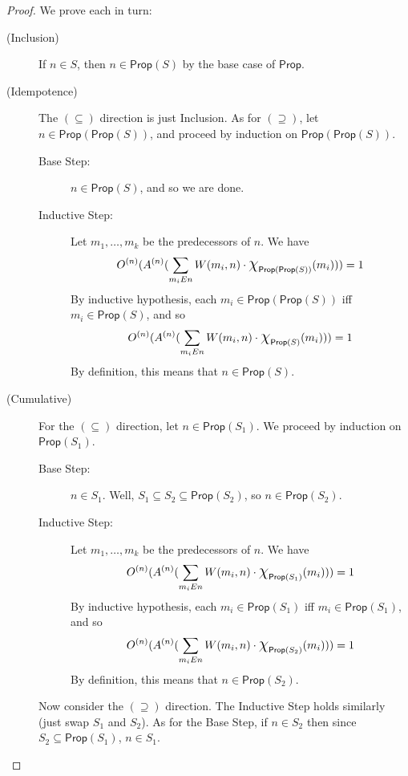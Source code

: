\documentclass[letterpaper]{article}
\theoremstyle{definition}
\newcommand*{\bigchi}{\mbox{\Large$\chi$}}%
\newcommand{\Prop}{\textsf{Prop}}
\begin{document}
\begin{proof} We prove each in turn:
\begin{description}
    \item[(Inclusion)] If $n \in S$, then $n \in \Prop(S)$ by the base case of $\Prop$.
    
    
    \item[(Idempotence)] The $(\subseteq)$ direction is just Inclusion.  As for $(\supseteq)$, let $n \in \Prop(\Prop(S))$, and proceed by induction on $\Prop(\Prop(S))$.
    
    \begin{description}
    \item[Base Step:] $n \in \Prop(S)$, and so we are done.
    
    \item[Inductive Step:] Let $m_1, \ldots, m_k$ be the predecessors of $n$. We have
    \[
    O^{(n)}(A^{(n)}(\sum_{m_i{E}n} W(m_i, n) \cdot \bigchi_{\Prop(\Prop(S))}(m_i))) = 1
    \]
    By inductive hypothesis, each $m_i \in \Prop(\Prop(S))$ iff $m_i \in \Prop(S)$, and so
    \[
    O^{(n)}(A^{(n)}(\sum_{m_i{E}n} W(m_i, n) \cdot \bigchi_{\Prop(S)}(m_i))) = 1
    \]
    By definition, this means that $n \in \Prop(S)$.
    \end{description}
    
    
    \item[(Cumulative)] For the $(\subseteq)$ direction, let $n \in \Prop(S_1)$.  We proceed by induction on $\Prop(S_1)$.
    
    \begin{description}
    \item[Base Step:] $n \in S_1$.  Well, $S_1 \subseteq S_2 \subseteq \Prop(S_2)$, so $n \in \Prop(S_2)$.
    
    \item[Inductive Step:] Let $m_1, \ldots, m_k$ be the predecessors of $n$. We have
    \[
    O^{(n)}(A^{(n)}(\sum_{m_i{E}n} W(m_i, n) \cdot \bigchi_{\Prop(S_1)}(m_i))) = 1
    \]
    By inductive hypothesis, each $m_i \in \Prop(S_1)$ iff $m_i \in \Prop(S_1)$, and so
    \[
    O^{(n)}(A^{(n)}(\sum_{m_i{E}n} W(m_i, n) \cdot \bigchi_{\Prop(S_2)}(m_i))) = 1
    \]
    By definition, this means that $n \in \Prop(S_2)$.
    \end{description}
    
    Now consider the $(\supseteq)$ direction.  The Inductive Step holds similarly (just swap $S_1$ and $S_2$).  As for the Base Step, if $n \in S_2$ then since $S_2 \subseteq \Prop(S_1)$, $n \in S_1$.
    

\end{description}
\end{proof}
\end{document}
